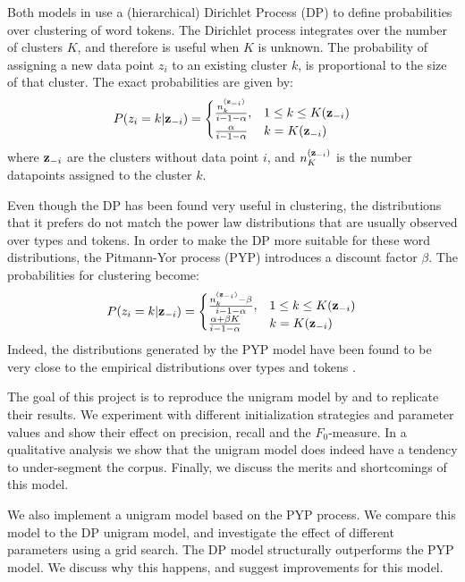 Both models in \cite{Goldwater200921} use a (hierarchical) Dirichlet Process (DP) to define probabilities over clustering of word tokens. The Dirichlet process integrates over the number of clusters $K$, and therefore is useful when $K$ is unknown. The probability of assigning a new data point $z_i$ to an existing cluster $k$, is proportional to the size of that cluster. The exact probabilities are given by:
\begin{align}
P(z_i=k|\bm{\mathbf{z}}_{-i}) = 
\begin{cases}
    \frac{n_k^{(\bm{\mathbf{z}}_{-i})}}{i - 1 - \alpha},& 1 \le k \le K(\bm{\mathbf{z}}_{-i})\\
    \frac{\alpha}{i - 1 - \alpha}              & k = K(\bm{\mathbf{z}}_{-i})\\
\end{cases} \label{eq:DP}
\end{align}
where $\bm{\mathbf{z}}_{-i}$ are the clusters without data point $i$, and $n_K^{(\bm{\mathbf{z}}_{-i})}$ is the number datapoints assigned to the cluster $k$.

Even though the DP has been found very useful in clustering, the distributions that it prefers do not match the power law distributions that are usually observed over types and tokens. In order to make the DP more suitable for these word distributions, the Pitmann-Yor process (PYP) \cite{pitman1997two} introduces a discount factor $\beta$. The probabilities for clustering become:
\begin{align}
P(z_i=k|\bm{\mathbf{z}}_{-i}) = 
\begin{cases}
    \frac{n_k^{(\bm{\mathbf{z}}_{-i})} - \beta}{i - 1 - \alpha},& 1 \le k \le K(\bm{\mathbf{z}}_{-i})\\
    \frac{\alpha + \beta K}{i - 1 - \alpha}              & k = K(\bm{\mathbf{z}}_{-i})\\
\end{cases}  \label{eq:PYP}
\end{align}
Indeed, the distributions generated by the PYP model have been found to be very close to the empirical distributions over types and tokens \cite{goldwater2005interpolating}.

The goal of this project is to reproduce the unigram model by \cite{Goldwater200921} and to replicate their results. We experiment with different initialization strategies and parameter values and show their effect on precision, recall and the $F_0$-measure. In a qualitative analysis we show that the unigram model does indeed have a tendency to under-segment the corpus. Finally, we discuss the merits and shortcomings of this model. 

We also implement a unigram model based on the PYP process. We compare this model to the DP unigram model, and investigate the effect of different parameters using a grid search. The DP model structurally outperforms the PYP model. We discuss why this happens, and suggest improvements for this model.
